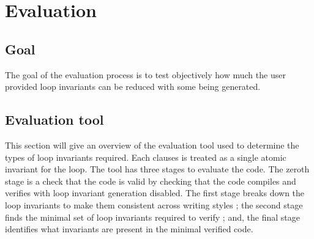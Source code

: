 \chapter{Evaluation}\label{C:eval}

\section{Goal}

The goal of the evaluation process is to test objectively how much the
user provided loop invariants can be reduced with some being generated.


\section{Evaluation tool}\label{S:eval-tool}

This section will give an overview of the evaluation tool used to
determine the types of loop invariants required.
Each  clauses is treated as a single atomic invariant for the loop.
The tool has three stages to evaluate the code.
The zeroth stage is a check that the code is valid by checking that
the code compiles and verifies with loop invariant generation disabled.
The first stage breaks down the loop invariants to make them consistent
across writing styles ;
the second stage finds the minimal set of loop invariants required to verify ;
and, the final stage identifies what invariants are present in the minimal
verified code.



